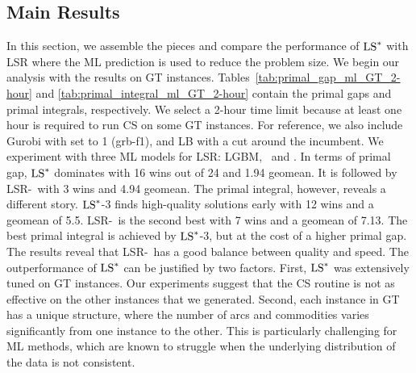 \documentclass[3p, authoryear, times, doubleblind]{elsarticle}
\begin{document}
{\subsection{Main Results} \label{sec:main_results}
In this section, we assemble the pieces and compare the performance of $\text{LS}^*$ with LSR where the ML prediction is used to reduce the problem size. We begin our analysis with the results on GT instances. Tables~\ref{tab:primal_gap_ml_GT_2-hour} and \ref{tab:primal_integral_ml_GT_2-hour} contain the primal gaps and primal integrals, respectively. We select a 2-hour time limit because at least one hour is required to run CS on some GT instances. For reference, we also include Gurobi with  set to 1 (grb-f1), and LB with a cut around the incumbent. We experiment with three ML models for LSR: LGBM, \lgbma\ and \lgbmb. In terms of primal gap, $\text{LS}^*$ dominates with 16 wins out of 24 and 1.94 geomean. It is followed by LSR-\lgbmb\ with 3 wins and 4.94 geomean. The primal integral, however, reveals a different story. $\text{LS}^*$-3 finds high-quality solutions early with 12 wins and a geomean of 5.5. LSR-\lgbmb\ is the second best with 7 wins and a geomean of 7.13. The best primal integral is achieved by $\text{LS}^*$-3, but at the cost of a higher primal gap. The results reveal that LSR-\lgbmb\ has a good balance between quality and speed. The outperformance of $\text{LS}^*$ can be justified by two factors. First, $\text{LS}^*$ was extensively tuned on GT instances.  Our experiments suggest that the CS routine is not as effective on the other instances that we generated. Second, each instance in GT has a unique structure, where the number of arcs and commodities varies significantly from one instance to the other. This is particularly challenging for ML methods, which are known to struggle when the underlying distribution of the data is not consistent.


}
\end{document}
